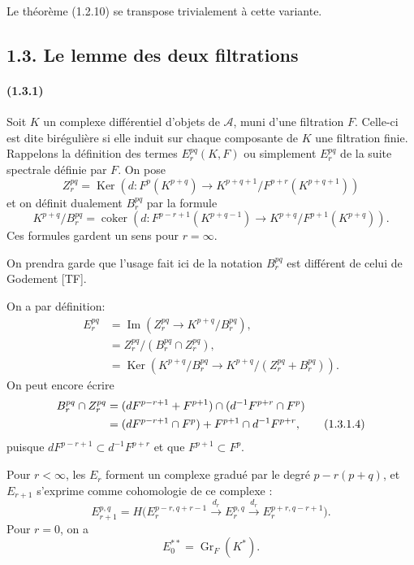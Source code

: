 \documentclass[10pt]{article}
\newcommand{\Gr}{\operatorname{Gr}}
\newcommand{\Ker}{\operatorname{Ker}}
\newcommand{\Imop}{\operatorname{Im}}
\newcommand{\coker}{\operatorname{coker}}
\newcommand{\calA}{\mathcal A}
\begin{document}
Le théorème (1.2.10) se transpose trivialement à cette variante.

\subsection*{1.3. Le lemme des deux filtrations}

\paragraph{(1.3.1)} Soit $K$ un complexe différentiel d'objets de $\calA$, muni d'une filtration $F$. Celle-ci est dite birégulière si elle induit sur chaque composante de $K$ une filtration finie. Rappelons la définition des termes $E_r^{pq}(K,F)$ ou simplement $E_r^{pq}$ de la suite spectrale définie par $F$. On pose
\[
Z_r^{pq}=\Ker\left(d:F^p(K^{p+q})\to K^{p+q+1}/F^{p+r}(K^{p+q+1})\right)
\]
et on définit dualement $B_r^{pq}$ par la formule
\[
K^{p+q}/B_r^{pq}=\coker\left(d:F^{p-r+1}(K^{p+q-1})\to K^{p+q}/F^{p+1}(K^{p+q})\right).
\]
Ces formules gardent un sens pour $r=\infty$.

On prendra garde que l'usage fait ici de la notation $B_r^{pq}$ est différent de celui de Godement [TF].

On a par définition:
\begin{align}
E_r^{pq}&=\Imop\left(Z_r^{pq}\to K^{p+q}/B_r^{pq}\right), \tag{1.3.1.1}\\
&=Z_r^{pq}/(B_r^{pq}\cap Z_r^{pq}), \tag{1.3.1.2}\\
&=\Ker\left(K^{p+q}/B_r^{pq}\to K^{p+q}/(Z_r^{pq}+B_r^{pq})\right). \tag{1.3.1.3}
\end{align}
On peut encore écrire
\begin{align}
B_r^{pq}\cap Z_r^{pq}
&=(dF^{p-r+1}+F^{p+1})\cap(d^{-1}F^{p+r}\cap F^p) \notag\\
&=(dF^{p-r+1}\cap F^p)+F^{p+1}\cap d^{-1}F^{p+r}, \tag{1.3.1.4}
\end{align}
puisque $dF^{p-r+1}\subset d^{-1}F^{p+r}$ et que $F^{p+1}\subset F^p$.


Pour $r<\infty$, les $E_r$ forment un complexe gradué par le degré $p-r(p+q)$, et $E_{r+1}$ s'exprime comme cohomologie de ce complexe :
\[
\tag{1.3.1.5}
E_{r+1}^{p,q}=H\bigl(E_r^{p-r,q+r-1}\xrightarrow{d_r}E_r^{p,q}\xrightarrow{d_r}E_r^{p+r,q-r+1}\bigr).
\]
Pour $r=0$, on a
\[
\tag{1.3.1.6}
E_0^{**}=\Gr_F(K^*).
\]
\end{document}
